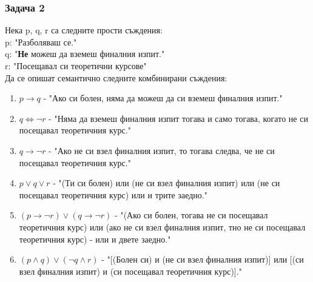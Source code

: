 \documentclass[fleqn, 12pt]{article}
\theoremstyle{definition}
\begin{document}
\subsubsection*{Задача 2}
Нека p, q, r са следните прости съждения:\\
p: "Разболяваш се." \\
q: "\textbf{Не} можеш да вземеш финалния изпит." \\
r: "Посещавал си теоретични курсове" \\
Да се опишат семантично следните комбинирани съждения:
\begin{enumerate}
\item $p \to q$ - "Ако си болен, няма да можеш да си вземеш финалния изпит."
\item $q \Leftrightarrow \neg r$ - "Няма да вземеш финалния изпит тогава и само тогава, когато не си посещавал теоретичния курс."
\item $q \to \neg r$ - "Ако не си взел финалния изпит, то тогава следва, че не си посещавал теоретичния курс."
\item $p \lor q \lor r$ - "(Ти си болен) или (не си взел финалния изпит) или (не си посещавал теоретичния курс) или и трите заедно."
\item $(p \to \neg r) \lor (q \to \neg r)$ - "(Ако си болен, тогава не си посещавал теоретичния курс) или (ако не си взел финалния изпит, тно не си посещавал теоретичния курс) - или и двете заедно."
\item $(p \land q) \lor (\neg q \land r)$ - "[(Болен си) и (не си взел финалния изпит)] или [(си взел финалния изпит) и (си посещавал теоретичния курс)]."
\end{enumerate}
\end{document}
